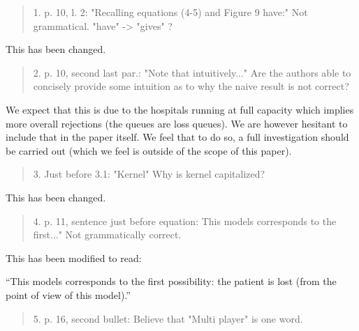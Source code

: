 \documentclass{article}
\begin{document}
\begin{quote}
    \begin{textit}{
1. p. 10, l. 2: "Recalling equations (4-5) and Figure 9 have:"
Not grammatical. "have" -> "gives" ?
    }\end{textit}
\end{quote}

This has been changed.

\begin{quote}
    \begin{textit}{
        2. p. 10, second last par.: "Note that intuitively..."
        Are the authors able to concisely provide some intuition as to why
        the naive result is not correct?
    }\end{textit}
\end{quote}

We expect that this is due to the hospitals running at full capacity which
implies more overall rejections (the queues are loss queues). We are however
hesitant to include that in the paper itself. We feel that to do so, a full
investigation should be carried out (which we feel is outside of the scope of
this paper).

\begin{quote}
    \begin{textit}{
        3. Just before 3.1: "Kernel"
        Why is kernel capitalized?
    }\end{textit}
\end{quote}

This has been changed.

\begin{quote}
    \begin{textit}{
        4. p. 11, sentence just before equation: This models corresponds to
        the first..."
        Not grammatically correct.
    }\end{textit}
\end{quote}

This has been modified to read:

``This models corresponds to the first
possibility: the patient is lost (from the point of view of this model).''


\begin{quote}
    \begin{textit}{
        5. p. 16, second bullet:
        Believe that "Multi player" is one word.
    }\end{textit}
\end{quote}
\end{document}
